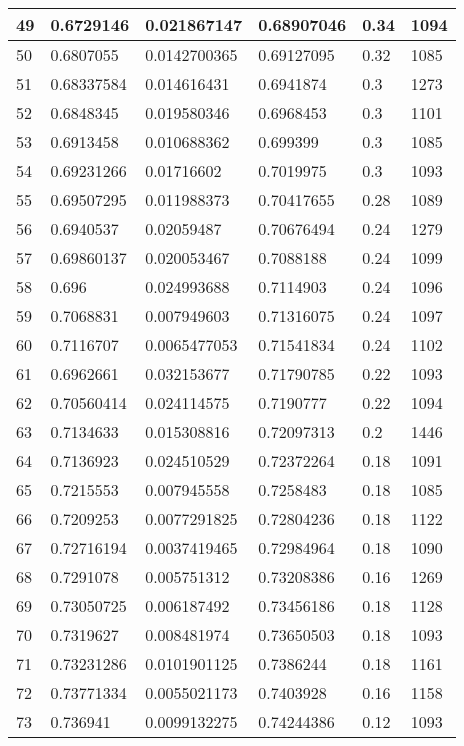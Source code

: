 \begin{longtable}{|l|l|l|l|l|l|}
49 & 0.6729146 & 0.021867147 & 0.68907046 & 0.34 & 1094 \\ \hline 
50 & 0.6807055 & 0.0142700365 & 0.69127095 & 0.32 & 1085 \\ \hline 
51 & 0.68337584 & 0.014616431 & 0.6941874 & 0.3 & 1273 \\ \hline 
52 & 0.6848345 & 0.019580346 & 0.6968453 & 0.3 & 1101 \\ \hline 
53 & 0.6913458 & 0.010688362 & 0.699399 & 0.3 & 1085 \\ \hline 
54 & 0.69231266 & 0.01716602 & 0.7019975 & 0.3 & 1093 \\ \hline 
55 & 0.69507295 & 0.011988373 & 0.70417655 & 0.28 & 1089 \\ \hline 
56 & 0.6940537 & 0.02059487 & 0.70676494 & 0.24 & 1279 \\ \hline 
57 & 0.69860137 & 0.020053467 & 0.7088188 & 0.24 & 1099 \\ \hline 
58 & 0.696 & 0.024993688 & 0.7114903 & 0.24 & 1096 \\ \hline 
59 & 0.7068831 & 0.007949603 & 0.71316075 & 0.24 & 1097 \\ \hline 
60 & 0.7116707 & 0.0065477053 & 0.71541834 & 0.24 & 1102 \\ \hline 
61 & 0.6962661 & 0.032153677 & 0.71790785 & 0.22 & 1093 \\ \hline 
62 & 0.70560414 & 0.024114575 & 0.7190777 & 0.22 & 1094 \\ \hline 
63 & 0.7134633 & 0.015308816 & 0.72097313 & 0.2 & 1446 \\ \hline 
64 & 0.7136923 & 0.024510529 & 0.72372264 & 0.18 & 1091 \\ \hline 
65 & 0.7215553 & 0.007945558 & 0.7258483 & 0.18 & 1085 \\ \hline 
66 & 0.7209253 & 0.0077291825 & 0.72804236 & 0.18 & 1122 \\ \hline 
67 & 0.72716194 & 0.0037419465 & 0.72984964 & 0.18 & 1090 \\ \hline 
68 & 0.7291078 & 0.005751312 & 0.73208386 & 0.16 & 1269 \\ \hline 
69 & 0.73050725 & 0.006187492 & 0.73456186 & 0.18 & 1128 \\ \hline 
70 & 0.7319627 & 0.008481974 & 0.73650503 & 0.18 & 1093 \\ \hline 
71 & 0.73231286 & 0.0101901125 & 0.7386244 & 0.18 & 1161 \\ \hline 
72 & 0.73771334 & 0.0055021173 & 0.7403928 & 0.16 & 1158 \\ \hline 
73 & 0.736941 & 0.0099132275 & 0.74244386 & 0.12 & 1093 \\ \hline 

\end{longtable}
